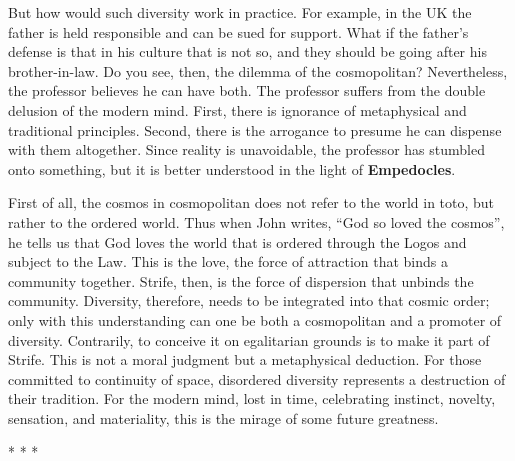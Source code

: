But how would such diversity work in practice. For example, in the UK the father is held responsible and can be sued for support. What if the father's defense is that in his culture that is not so, and they should be going after his brother-in-law. Do you see, then, the dilemma of the cosmopolitan? Nevertheless, the professor believes he can have both. The professor suffers from the double delusion of the modern mind. First, there is ignorance of metaphysical and traditional principles. Second, there is the arrogance to presume he can dispense with them altogether. Since reality is unavoidable, the professor has stumbled onto something, but it is better understood in the light of \textbf{Empedocles}.

First of all, the cosmos in cosmopolitan does not refer to the world in toto, but rather to the ordered world. Thus when John writes, ``God so loved the cosmos'', he tells us that God loves the world that is ordered through the Logos and subject to the Law. This is the love, the force of attraction that binds a community together. Strife, then, is the force of dispersion that unbinds the community. Diversity, therefore, needs to be integrated into that cosmic order; only with this understanding can one be both a cosmopolitan and a promoter of diversity. Contrarily, to conceive it on egalitarian grounds is to make it part of Strife. This is not a moral judgment but a metaphysical deduction. For those committed to continuity of space, disordered diversity represents a destruction of their tradition. For the modern mind, lost in time, celebrating instinct, novelty, sensation, and materiality, this is the mirage of some future greatness.



\begin{center}* * *\end{center}


